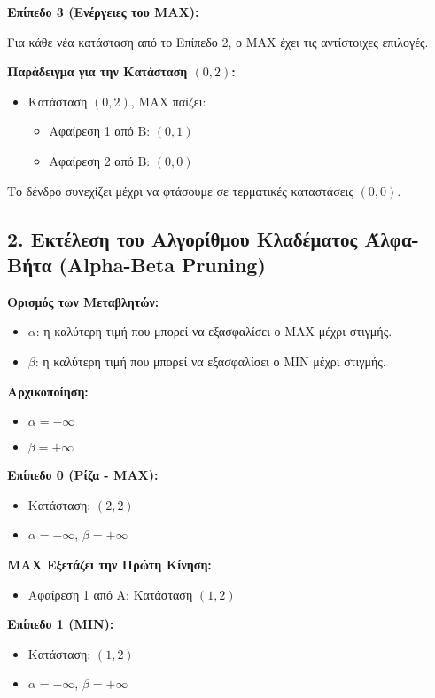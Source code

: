 \documentclass{article}
\begin{document}
\textbf{Επίπεδο 3 (Ενέργειες του MAX):}

Για κάθε νέα κατάσταση από το Επίπεδο 2, ο MAX έχει τις αντίστοιχες επιλογές.

\textbf{Παράδειγμα για την Κατάσταση $(0, 2)$:}
\begin{itemize}
    \item Κατάσταση $(0, 2)$, MAX παίζει:
    \begin{itemize}
        \item Αφαίρεση 1 από B: $(0, 1)$
        \item Αφαίρεση 2 από B: $(0, 0)$
    \end{itemize}
\end{itemize}

Το δένδρο συνεχίζει μέχρι να φτάσουμε σε τερματικές καταστάσεις $(0, 0)$.

\subsection*{2. Εκτέλεση του Αλγορίθμου Κλαδέματος Άλφα-Βήτα (Alpha-Beta Pruning)}

\textbf{Ορισμός των Μεταβλητών:}
\begin{itemize}
    \item \(\alpha\): η καλύτερη τιμή που μπορεί να εξασφαλίσει ο MAX μέχρι στιγμής.
    \item \(\beta\): η καλύτερη τιμή που μπορεί να εξασφαλίσει ο MIN μέχρι στιγμής.
\end{itemize}

\textbf{Αρχικοποίηση:}
\begin{itemize}
    \item \(\alpha = -\infty\)
    \item \(\beta = +\infty\)
\end{itemize}

\textbf{Επίπεδο 0 (Ρίζα - MAX):}
\begin{itemize}
    \item Κατάσταση: $(2, 2)$
    \item \(\alpha = -\infty\), \(\beta = +\infty\)
\end{itemize}

\textbf{MAX Εξετάζει την Πρώτη Κίνηση:}
\begin{itemize}
    \item Αφαίρεση 1 από A: Κατάσταση $(1, 2)$
\end{itemize}

\textbf{Επίπεδο 1 (MIN):}
\begin{itemize}
    \item Κατάσταση: $(1, 2)$
    \item \(\alpha = -\infty\), \(\beta = +\infty\)
\end{itemize}
\end{document}

